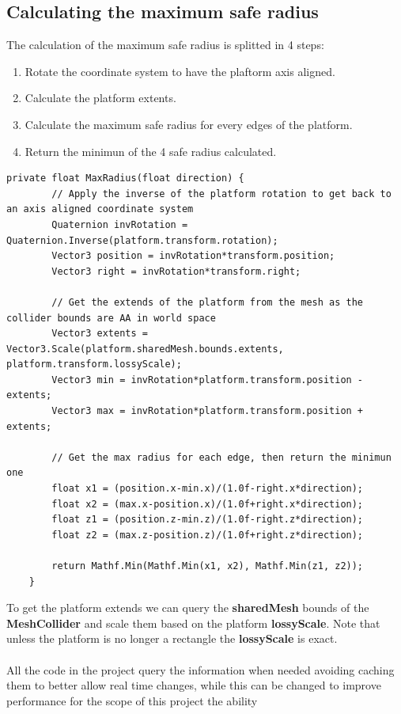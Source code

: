 \documentclass[12pt, a4paper]{article}
\begin{document}
\subsection{Calculating the maximum safe radius}
The calculation of the maximum safe radius is splitted in 4 steps:
\begin{enumerate}
\item Rotate the coordinate system to have the plaftorm axis aligned.
\item Calculate the platform extents.
\item Calculate the maximum safe radius for every edges of the platform.
\item Return the minimun of the 4 safe radius calculated.
\end{enumerate}
\begin{lstlisting}[caption={MaxRadius}]
    private float MaxRadius(float direction) {
        // Apply the inverse of the platform rotation to get back to an axis aligned coordinate system
        Quaternion invRotation = Quaternion.Inverse(platform.transform.rotation);
        Vector3 position = invRotation*transform.position;
        Vector3 right = invRotation*transform.right;

        // Get the extends of the platform from the mesh as the collider bounds are AA in world space
        Vector3 extents = Vector3.Scale(platform.sharedMesh.bounds.extents, platform.transform.lossyScale);
        Vector3 min = invRotation*platform.transform.position - extents;
        Vector3 max = invRotation*platform.transform.position + extents;

        // Get the max radius for each edge, then return the minimun one
        float x1 = (position.x-min.x)/(1.0f-right.x*direction);
        float x2 = (max.x-position.x)/(1.0f+right.x*direction);
        float z1 = (position.z-min.z)/(1.0f-right.z*direction);
        float z2 = (max.z-position.z)/(1.0f+right.z*direction);

        return Mathf.Min(Mathf.Min(x1, x2), Mathf.Min(z1, z2));
    }
\end{lstlisting}
To get the platform extends we can query the \textbf{sharedMesh} bounds of the \textbf{MeshCollider} and scale them based on the platform \textbf{lossyScale}.
Note that unless the platform is no longer a rectangle the \textbf{lossyScale} is exact.\\\\
All the code in the project query the information when needed avoiding caching them to better allow real time changes, while this can be changed to improve performance for the scope of this project the ability
\end{document}
